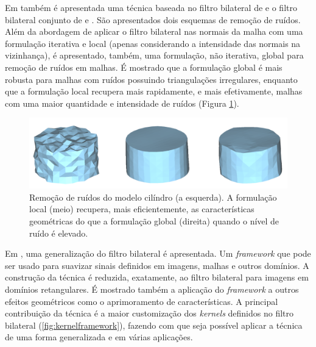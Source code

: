 Em \cite{zheng2011bilateral} também é apresentada uma técnica baseada no filtro bilateral de \cite{tomasi1998bilateral} e o filtro bilateral conjunto de \cite{eisemann2004flash} e \cite{petschnigg2004digital}. São apresentados dois esquemas de remoção de ruídos. Além da abordagem de aplicar o filtro bilateral nas normais da malha com uma formulação iterativa e local (apenas considerando a intensidade das normais na vizinhança), é apresentado, também, uma formulação, não iterativa, global para remoção de ruídos em malhas. É mostrado que a formulação global é mais robusta para malhas com ruídos possuindo triangulações irregulares, enquanto que a formulação local recupera mais rapidamente, e mais efetivamente, malhas com uma maior quantidade e intensidade de ruídos (Figura \ref{fig:globalxlocal}).

\begin{figure}[!h]
\captionsetup{width=\linewidth}
\centering
\includegraphics[scale=0.3]{figuras/globalxlocal.png}
\caption{Remoção de ruídos do modelo cilíndro (a esquerda). A formulação local (meio) recupera, mais eficientemente, as características geométricas do que a formulação global (direita) quando o nível de ruído é elevado.}
\label{fig:globalxlocal}
\end{figure}

Em \cite{solomon2014general}, uma generalização do filtro bilateral é apresentada. Um \textit{framework} que pode ser usado para suavizar sinais definidos em imagens, malhas e outros domínios. A construção da técnica é reduzida, exatamente, ao filtro bilateral para imagens em domínios retangulares. É mostrado também a aplicação do \textit{framework} a outros efeitos geométricos como o aprimoramento de características. A principal contribuição da técnica é a maior customização dos \textit{kernels} definidos no filtro bilateral (\ref{fig:kernelframework}), fazendo com que seja possível aplicar a técnica de uma forma generalizada e em várias aplicações.

